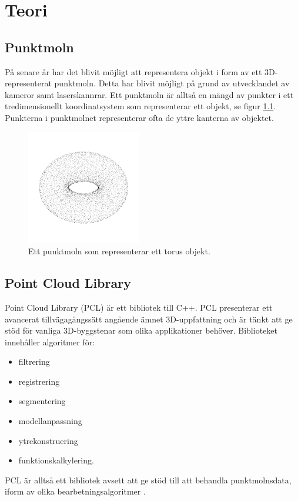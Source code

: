 \chapter{Teori}
\label{cha:theory}



\section{Punktmoln}
På senare år har det blivit möjligt att representera objekt i form av ett 3D-representerat punktmoln. Detta har blivit möjligt på grund av utvecklandet av kameror samt laserskannrar. Ett punktmoln är alltså en mängd av punkter i ett tredimensionellt koordinatsystem som representerar ett objekt, se figur \ref{fig:point_cloud_torus}. Punkterna i punktmolnet representerar ofta de yttre kanterna av objektet.

\begin{figure}[H]
	\centering
	\includegraphics[width=50mm]{figures/Point_cloud_torus.png}
	\caption{Ett punktmoln som representerar ett torus objekt.}
	\label{fig:point_cloud_torus}
\end{figure}


\section{Point Cloud Library}
Point Cloud Library (PCL) är ett bibliotek till C++. PCL presenterar ett avancerat tillvägagångssätt angående ämnet 3D-uppfattning och är tänkt att ge stöd för vanliga 3D-byggstenar som olika applikationer behöver. Biblioteket innehåller algoritmer för:

\begin{itemize}
	\item filtrering
	\item registrering
	\item segmentering
	\item modellanpassning
	\item ytrekonstruering
	\item funktionskalkylering.
\end{itemize}
PCL är alltså ett bibliotek avsett att ge stöd till att behandla punktmolnsdata, iform av olika bearbetningsalgoritmer \cite{rusu20113d}.

